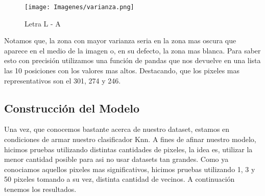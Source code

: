 \documentclass[10pt,a4paper]{article}
\begin{document}
\begin{figure}[h]
  \centering
  \texttt{[image: Imagenes/varianza.png]}
  \caption{Letra L - A}
  \label{fig:Tabla 1}
\end{figure}

Notamos que, la zona con mayor varianza seria en la zona mas oscura que aparece en el medio de la imagen o, en su defecto, la zona mas blanca. Para saber esto con precisión utilizamos una función de pandas que nos devuelve en una lista las 10 posiciones con los valores mas altos. Destacando, que los pixeles
mas representativos son el 301, 274 y 246. 

\subsection{Construcción del Modelo} \vspace{0.1cm}

Una vez, que conocemos bastante acerca de nuestro dataset, estamos en condiciones de armar nuestro clasificador Knn. A fines de afinar nuestro modelo, hicimos pruebas utilizando distintas cantidades de pixeles, la idea es, utilizar la menor cantidad posible para asi no usar datasets tan grandes. \vspace{0.05cm}
Como ya conociamos aquellos pixeles mas significativos, hicimos pruebas utilizando 1, 3 y 50 pixeles tomando a su vez, distinta cantidad de vecinos. 
A continuación tenemos los resultados.
\end{document}
